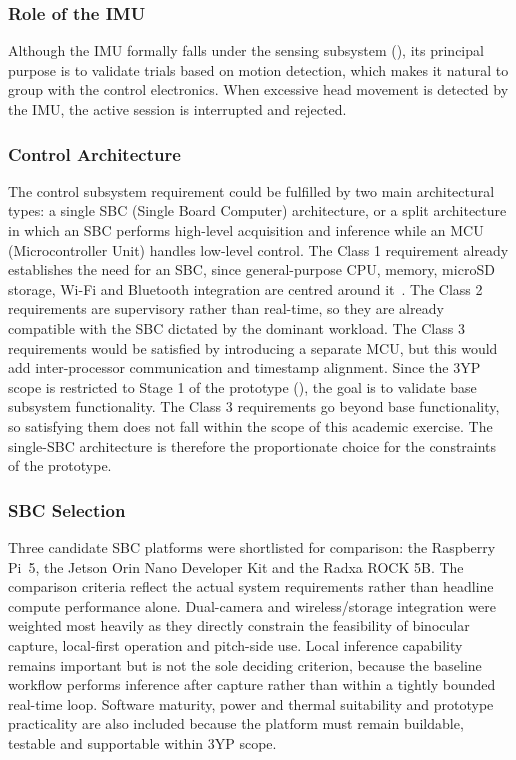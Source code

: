 \subsubsection{Role of the IMU}

Although the IMU formally falls under the sensing subsystem (), its principal purpose is to validate trials based on motion detection, which makes it natural to group with the control electronics. When excessive head movement is detected by the IMU, the active session is interrupted and rejected.

\subsubsection{Control Architecture}

The control subsystem requirement could be fulfilled by two main architectural types: a single SBC (Single Board Computer) architecture, or a split architecture in which an SBC performs high-level acquisition and inference while an MCU (Microcontroller Unit) handles low-level control. The Class 1 requirement already establishes the need for an SBC, since general-purpose CPU, memory, microSD storage, Wi-Fi and Bluetooth integration are centred around it~\cite{blanchard2011systems}. The Class 2 requirements are supervisory rather than real-time, so they are already compatible with the SBC dictated by the dominant workload. The Class 3 requirements would be satisfied by introducing a separate MCU, but this would add inter-processor communication and timestamp alignment. Since the 3YP scope is restricted to Stage 1 of the prototype (), the goal is to validate base subsystem functionality. The Class 3 requirements go beyond base functionality, so satisfying them does not fall within the scope of this academic exercise. The single-SBC architecture is therefore the proportionate choice for the constraints of the prototype.

\subsubsection{SBC Selection}

Three candidate SBC platforms were shortlisted for comparison: the Raspberry Pi~5, the Jetson Orin Nano Developer Kit and the Radxa ROCK 5B. The comparison criteria reflect the actual system requirements rather than headline compute performance alone. Dual-camera and wireless/storage integration were weighted most heavily as they directly constrain the feasibility of binocular capture, local-first operation and pitch-side use. Local inference capability remains important but is not the sole deciding criterion, because the baseline workflow performs inference after capture rather than within a tightly bounded real-time loop. Software maturity, power and thermal suitability and prototype practicality are also included because the platform must remain buildable, testable and supportable within 3YP scope.

